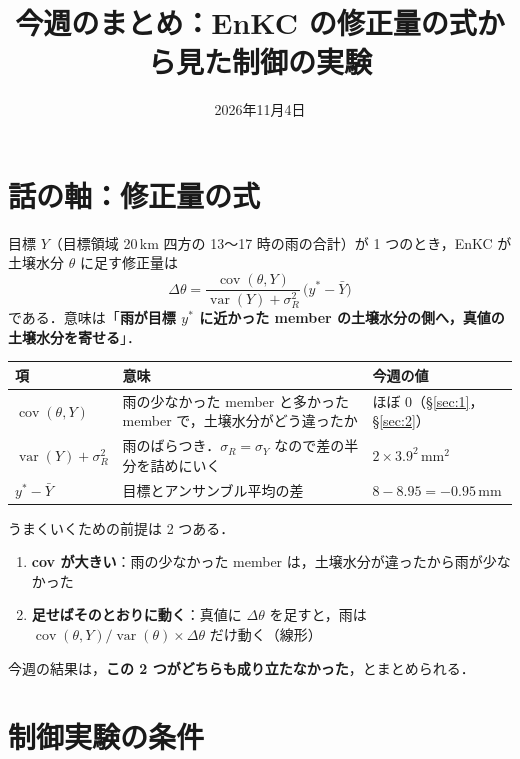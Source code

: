\documentclass[dvipdfmx,a4paper,10.5pt]{jarticle}
\title{今週のまとめ：EnKC の修正量の式から見た制御の実験}
\author{}
\date{2026年11月4日}
\numberwithin{equation}{section}
\newcommand{\cov}{\operatorname{cov}}
\newcommand{\Var}{\operatorname{var}}
\begin{document}
\maketitle
\tableofcontents
\clearpage

\section{話の軸：修正量の式}

目標 $Y$（目標領域 20\,km 四方の 13〜17 時の雨の合計）が 1 つのとき，EnKC が土壌水分 $\theta$ に足す修正量は
\begin{equation}
  \boxed{\;\Delta\theta=\frac{\cov(\theta,Y)}{\Var(Y)+\sigma_R^2}\,\bigl(y^*-\bar Y\bigr)\;}
  \label{eq:dtheta}
\end{equation}
である．意味は「\textbf{雨が目標 $y^*$ に近かった member の土壌水分の側へ，真値の土壌水分を寄せる}」．

\begin{center}
\begin{tabular}{lp{}l}\toprule
項 & 意味 & 今週の値 \\ \midrule
$\cov(\theta,Y)$ & 雨の少なかった member と多かった member で，土壌水分がどう違ったか & ほぼ 0（\S\ref{sec:1}，\S\ref{sec:2}） \\
$\Var(Y)+\sigma_R^2$ & 雨のばらつき．$\sigma_R=\sigma_Y$ なので差の半分を詰めにいく & $2\times3.9^2$\,mm$^2$ \\
$y^*-\bar Y$ & 目標とアンサンブル平均の差 & $8-8.95=-0.95$\,mm \\ \bottomrule
\end{tabular}
\end{center}

うまくいくための前提は 2 つある．
\begin{enumerate}
  \item \textbf{cov が大きい}：雨の少なかった member は，土壌水分が違ったから雨が少なかった
  \item \textbf{足せばそのとおりに動く}：真値に $\Delta\theta$ を足すと，雨は $\cov(\theta,Y)/\Var(\theta)\times\Delta\theta$ だけ動く（線形）
\end{enumerate}
今週の結果は，\textbf{この 2 つがどちらも成り立たなかった}，とまとめられる．

\section{制御実験の条件}\label{sec:cond}
\end{document}
